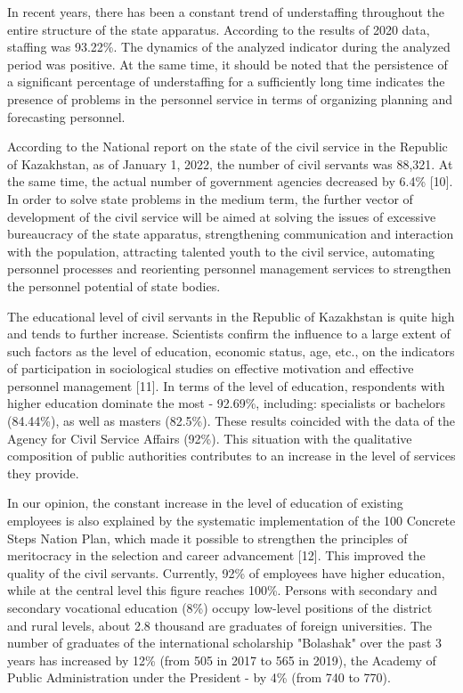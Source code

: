\begin{multicols}{2}
In recent years, there has been a constant trend of understaffing
throughout the entire structure of the state apparatus. According to the
results of 2020 data, staffing was 93.22\%. The dynamics of the analyzed
indicator during the analyzed period was positive. At the same time, it
should be noted that the persistence of a significant percentage of
understaffing for a sufficiently long time indicates the presence of
problems in the personnel service in terms of organizing planning and
forecasting personnel.

According to the National report on the state of the civil service in
the Republic of Kazakhstan, as of January 1, 2022, the number of civil
servants was 88,321. At the same time, the actual number of government
agencies decreased by 6.4\% {[}10{]}. In order to solve state problems
in the medium term, the further vector of development of the civil
service will be aimed at solving the issues of excessive bureaucracy of
the state apparatus, strengthening communication and interaction with
the population, attracting talented youth to the civil service,
automating personnel processes and reorienting personnel management
services to strengthen the personnel potential of state bodies.

The educational level of civil servants in the Republic of Kazakhstan is
quite high and tends to further increase. Scientists confirm the
influence to a large extent of such factors as the level of education,
economic status, age, etc., on the indicators of participation in
sociological studies on effective motivation and effective personnel
management {[}11{]}. In terms of the level of education, respondents
with higher education dominate the most - 92.69\%, including:
specialists or bachelors (84.44\%), as well as masters (82.5\%). These
results coincided with the data of the Agency for Civil Service Affairs
(92\%). This situation with the qualitative composition of public
authorities contributes to an increase in the level of services they
provide.

In our opinion, the constant increase in the level of education of
existing employees is also explained by the systematic implementation of
the 100 Concrete Steps Nation Plan, which made it possible to strengthen
the principles of meritocracy in the selection and career advancement
{[}12{]}. This improved the quality of the civil servants. Currently,
92\% of employees have higher education, while at the central level this
figure reaches 100\%. Persons with secondary and secondary vocational
education (8\%) occupy low-level positions of the district and rural
levels, about 2.8 thousand are graduates of foreign universities. The
number of graduates of the international scholarship "Bolashak" over the
past 3 years has increased by 12\% (from 505 in 2017 to 565 in 2019),
the Academy of Public Administration under the President - by 4\% (from
740 to 770).


\end{multicols}
